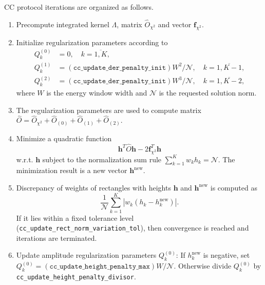 \documentclass[]{article}
\begin{document}
CC protocol iterations are organized as follows.
\begin{enumerate}
    \item Precompute integrated kernel $\Lambda$, matrix $\hat O_{\chi^2}$ and vector $\mathbf{f}_{\chi^2}$.

    \item Initialize regularization parameters according to
    \begin{align*}
        Q^{(0)}_k &= 0, \quad k=\overline{1,K},\\
        Q^{(1)}_k &= (\mathtt{cc\_update\_der\_penalty\_init})W^2 / \mathcal{N}, \quad k = \overline{1,K-1},\\
        Q^{(2)}_k &= (\mathtt{cc\_update\_der\_penalty\_init})W^3 / \mathcal{N}, \quad k = \overline{1,K-2},
    \end{align*}
    where $W$ is the energy window width and $\mathcal{N}$ is the requested solution norm.

    \item The regularization parameters are used to compute matrix $\hat O = 
    \hat O_{\chi^2} + \hat O_{(0)} + \hat O_{(1)} + \hat O_{(2)}$.

    \item Minimize a quadratic function
    \begin{equation}
        \mathbf{h}^T \hat O \mathbf{h} -2\mathbf{f}^T_{\chi^2} \mathbf{h}
    \end{equation}
    w.r.t. $\mathbf{h}$ subject to the normalization sum rule $\sum_{k=1}^K w_k h_k = \mathcal{N}$. The minimization result is a new  vector $\mathbf{h}^\mathrm{new}$.

    \item Discrepancy of weights of rectangles with heights $\mathbf{h}$ and $\mathbf{h}^\mathrm{new}$ is computed as
    \begin{equation}
        \frac{1}{\mathcal{N}}\sum_{k=1}^K |w_k (h_k - h^\mathrm{new}_k)|.
    \end{equation}
    If it lies within a fixed tolerance level (\verb|cc_update_rect_norm_variation_tol|),
    then convergence is reached and iterations are terminated.

    \item Update amplitude regularization parameters $Q^{(0)}_k$: If $h^\mathrm{new}_k$ is negative, set\\
    $Q^{(0)}_k = (\mathtt{cc\_update\_height\_penalty\_max})W / \mathcal{N}$.
    Otherwise divide $Q^{(0)}_k$ by \verb|cc_update_height_penalty_divisor|.


\end{enumerate}
\end{document}
